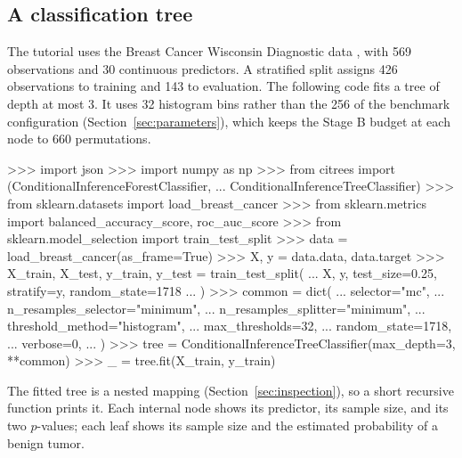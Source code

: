\documentclass[article]{jss}
\begin{document}
\subsection{A classification tree} \label{sec:tutorial}

The tutorial uses the Breast Cancer Wisconsin Diagnostic data
\citep{Wolberg+Mangasarian+Street+Street:1993}, with 569 observations and 30
continuous predictors. A stratified split assigns 426 observations to training
and 143 to evaluation. The following code fits a tree of depth at most 3. It
uses 32 histogram bins rather than the 256 of the benchmark configuration
(Section~\ref{sec:parameters}), which keeps the Stage B budget at each node to
660 permutations.
%
\begin{CodeChunk}
\begin{CodeInput}
>>> import json
>>> import numpy as np
>>> from citrees import (ConditionalInferenceForestClassifier,
...                      ConditionalInferenceTreeClassifier)
>>> from sklearn.datasets import load_breast_cancer
>>> from sklearn.metrics import balanced_accuracy_score, roc_auc_score
>>> from sklearn.model_selection import train_test_split
>>> data = load_breast_cancer(as_frame=True)
>>> X, y = data.data, data.target
>>> X_train, X_test, y_train, y_test = train_test_split(
...     X, y, test_size=0.25, stratify=y, random_state=1718
... )
>>> common = dict(
...     selector="mc",
...     n_resamples_selector="minimum",
...     n_resamples_splitter="minimum",
...     threshold_method="histogram",
...     max_thresholds=32,
...     random_state=1718,
...     verbose=0,
... )
>>> tree = ConditionalInferenceTreeClassifier(max_depth=3, **common)
>>> _ = tree.fit(X_train, y_train)
\end{CodeInput}
\end{CodeChunk}
%
The fitted tree is a nested mapping (Section~\ref{sec:inspection}), so a short
recursive function prints it. Each internal node shows its predictor, its
sample size, and its two $p$-values; each leaf shows its sample size and the
estimated probability of a benign tumor.
%
\end{document}
